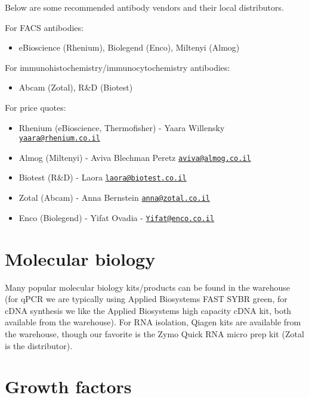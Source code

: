 \documentclass[
]{book}
\providecommand{\tightlist}{%
  \setlength{\itemsep}{0pt}\setlength{\parskip}{0pt}}
\begin{document}
Below are some recommended antibody vendors and their local distributors.

For FACS antibodies:

\begin{itemize}
\tightlist
\item
  eBioscience (Rhenium), Biolegend (Enco), Miltenyi (Almog)
\end{itemize}

For immunohistochemistry/immunocytochemistry antibodies:

\begin{itemize}
\tightlist
\item
  Abcam (Zotal), R\&D (Biotest)
\end{itemize}

For price quotes:

\begin{itemize}
\tightlist
\item
  Rhenium (eBioscience, Thermofisher) - Yaara Willensky \href{mailto:yaara@rhenium.co.il}{\nolinkurl{yaara@rhenium.co.il}}
\item
  Almog (Miltenyi) - Aviva Blechman Peretz \href{mailto:aviva@almog.co.il}{\nolinkurl{aviva@almog.co.il}}
\item
  Biotest (R\&D) - Laora \href{mailto:laora@biotest.co.il}{\nolinkurl{laora@biotest.co.il}}
\item
  Zotal (Abcam) - Anna Bernstein \href{mailto:anna@zotal.co.il}{\nolinkurl{anna@zotal.co.il}}
\item
  Enco (Biolegend) - Yifat Ovadia - \href{mailto:Yifat@enco.co.il}{\nolinkurl{Yifat@enco.co.il}}
\end{itemize}

\hypertarget{molecular-biology}{%
\section{Molecular biology}\label{molecular-biology}}

Many popular molecular biology kits/products can be found in the warehouse (for qPCR we are typically using Applied Biosystems FAST SYBR green, for cDNA synthesis we like the Applied Biosystems high capacity cDNA kit, both available from the warehouse). For RNA isolation, Qiagen kits are available from the warehouse, though our favorite is the Zymo Quick RNA micro prep kit (Zotal is the distributor).

\hypertarget{growth-factors}{%
\section{Growth factors}\label{growth-factors}}
\end{document}
